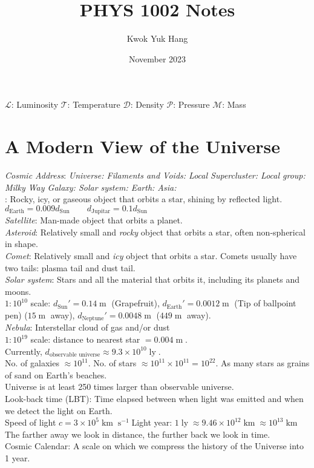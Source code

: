 \documentclass{article}
\title{PHYS 1002 Notes}
\author{Kwok Yuk Hang}
\date{November 2023}
\DeclareMathOperator{\s}{s}
\DeclareMathOperator{\m}{m}
\DeclareMathOperator{\km}{km}
\DeclareMathOperator{\ly}{ly}
\begin{document}
$\mathcal{L}$: Luminosity \quad $\mathcal{T}$: Temperature \quad $\mathcal{D}$: Density \quad $\mathcal{P}$: Pressure \quad $\mathcal{M}$: Mass
\section{A Modern View of the Universe}
\textit{Cosmic Address}: \textit{Universe: Filaments and Voids: Local Supercluster: Local group: Milky Way Galaxy: Solar system: Earth: Asia:}\\
: Rocky, icy, or gaseous object that orbits a star, shining by reflected light. $d_{\text{Earth}}=0.009d_{\text{Sun}}\qquad d_{\text{Jupitar}}=0.1d_{\text{Sun}}$\\
\textit{Satellite}: Man-made object that orbits a planet.\\
\textit{Asteroid}: Relatively small and \textit{rocky} object that orbits a star, often non-spherical in shape.\\
\textit{Comet}: Relatively small and \textit{icy} object that orbits a star. Comets usually have two tails: plasma tail and dust tail.\\
\textit{Solar system}: Stars and all the material that orbits it, including its planets and moons.\\
$1:10^{10}$ scale: $d_{\text{Sun}}'=0.14\m$ (Grapefruit), $d_{\text{Earth}}'=0.0012\m$ (Tip of ballpoint pen) ($15\m$ away), $d_{\text{Neptune}}'=0.0048\m$ ($449\m$ away).\\
\textit{Nebula}: Interstellar cloud of gas and/or dust\\
$1:10^{19}$ scale: distance to nearest star $=0.004\m$.\\
Currently, $d_{\text{observable universe}}\approx 9.3\times 10^{10}\ly$.\\
No. of galaxies $\approx 10^{11}$. No. of stars $\approx 10^{11}\times 10^{11}=10^{22}$. As many stars as grains of sand on Earth's beaches.\\
Universe is at least 250 times larger than observable universe.\\
Look-back time (LBT): Time elapsed between when light was emitted and when we detect the light on Earth.\\
Speed of light $c=3\times 10^{5}\km\s^{-1}$\qquad Light year: $1\ly\approx 9.46\times10^{12}\km\approx 10^{13}\km$\\
The farther away we look in distance, the further back we look in time.\\
Cosmic Calendar: A scale on which we compress the history of the Universe into 1 year.\\
\end{document}
